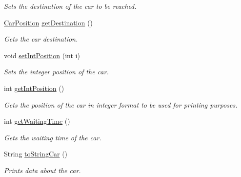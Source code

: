 \begin{DoxyCompactItemize}
\begin{DoxyCompactList}\small\item\em Sets the destination of the car to be reached. \end{DoxyCompactList}\item 
\hyperlink{class_car_position}{Car\+Position} \hyperlink{class_car_a24a7acc04b4ff363cd60c2dc8c0e5d26}{get\+Destination} ()
\begin{DoxyCompactList}\small\item\em Gets the car destination. \end{DoxyCompactList}\item 
void \hyperlink{class_car_ad654f48f8504b657ecaa866d90322513}{set\+Int\+Position} (int i)
\begin{DoxyCompactList}\small\item\em Sets the integer position of the car. \end{DoxyCompactList}\item 
int \hyperlink{class_car_ad6318c766e3d7235a3c75eaf71f3fd16}{get\+Int\+Position} ()
\begin{DoxyCompactList}\small\item\em Gets the position of the car in integer format to be used for printing purposes. \end{DoxyCompactList}\item 
int \hyperlink{class_car_a2b19b4d99199a18d4c331089164b2dc9}{get\+Waiting\+Time} ()
\begin{DoxyCompactList}\small\item\em Gets the waiting time of the car. \end{DoxyCompactList}\item 
String \hyperlink{class_car_a164ed12b81b460e2ef43f038f1aa6319}{to\+String\+Car} ()
\begin{DoxyCompactList}\small\item\em Prints data about the car. \end{DoxyCompactList}\end{DoxyCompactItemize}
